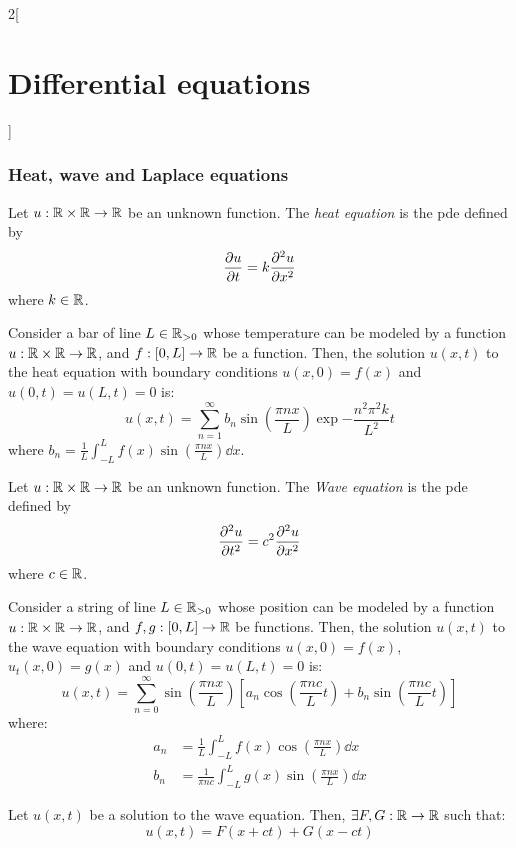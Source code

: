 \documentclass[../../../main_math.tex]{subfiles}
\begin{document}
\begin{multicols}{2}[\section{Differential equations}]
  \subsubsection{Heat, wave and Laplace equations}
  \begin{definition}
    Let $u:\mathbb{R}\times\mathbb{R}\rightarrow\mathbb{R}$ be an unknown function. The \emph{heat equation} is the pde defined by $$\pdv{u}{t}=k\pdv[2]{u}{x}$$ where $k\in\mathbb{R}$.
  \end{definition}
  \begin{proposition}
    Consider a bar of line $L\in\mathbb{R}_{>0}$ whose temperature can be modeled by a function $u:\mathbb{R}\times\mathbb{R}\rightarrow\mathbb{R}$, and $f:[0,L]\rightarrow\mathbb{R}$ be a function. Then, the solution $u(x,t)$ to the heat equation with boundary conditions $u(x,0)=f(x)$ and $u(0,t)=u(L,t)=0$ is: $$u(x,t)=\sum_{n=1}^\infty b_n\sin\left(\frac{\pi n x}{L}\right)\exp{-\frac{n^2\pi^2k}{L^2}t}$$ where $\displaystyle b_n=\frac{1}{L}\int_{-L}^Lf(x)\sin\left(\frac{\pi n x}{L}\right)\dd{x}$.
  \end{proposition}
  \begin{definition}
    Let $u:\mathbb{R}\times\mathbb{R}\rightarrow\mathbb{R}$ be an unknown function. The \emph{Wave equation} is the pde defined by $$\pdv[2]{u}{t}=c^2\pdv[2]{u}{x}$$ where $c\in\mathbb{R}$.
  \end{definition}
  \begin{proposition}
    Consider a string of line $L\in\mathbb{R}_{>0}$ whose position can be modeled by a function $u:\mathbb{R}\times\mathbb{R}\rightarrow\mathbb{R}$, and $f,g:[0,L]\rightarrow\mathbb{R}$ be functions. Then, the solution $u(x,t)$ to the wave equation with boundary conditions $u(x,0)=f(x)$, $u_t(x,0)=g(x)$ and $u(0,t)=u(L,t)=0$ is: $$u(x,t)=\sum_{n=0}^\infty \sin\left(\frac{\pi n x}{L}\right)\left[a_n\cos\left(\frac{\pi n c}{L}t\right)+ b_n\sin\left( \frac{\pi n c}{L}t\right)\right]$$ where:
    \begin{align*}
      a_n & =\frac{1}{L}\int_{-L}^Lf(x)\cos\left(\frac{\pi n x}{L}\right)\dd{x}       \\
      b_n & =\frac{1}{\pi n c}\int_{-L}^Lg(x)\sin\left(\frac{\pi n x}{L}\right)\dd{x}
    \end{align*}
  \end{proposition}
  \begin{proposition}
    Let $u(x,t)$ be a solution to the wave equation. Then, $\exists F,G:\mathbb{R}\rightarrow\mathbb{R}$ such that: $$u(x,t)=F(x+ct)+G(x-ct)$$
  \end{proposition}
  \begin{proposition}

\end{proposition}
\end{multicols}
\end{document}

